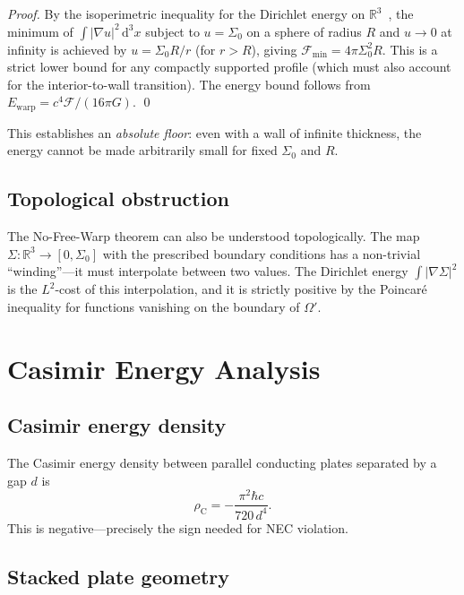 \documentclass[prd,twocolumn,superscriptaddress,longbibliography]{revtex4-2}
\newcommand{\Ewarp}{E_{\mathrm{warp}}}
\newcommand{\Fisher}{\mathcal{F}}
\newcommand{\dd}{\mathrm{d}}
\begin{document}
\noindent\emph{Proof.}\;
By the isoperimetric inequality for the Dirichlet energy on
$\mathbb{R}^3$~\cite{EvansBook}, the minimum of
$\int|\nabla u|^2\,\dd^3x$ subject to $u = \Sigma_0$ on a
sphere of radius $R$ and $u \to 0$ at infinity is achieved by
$u = \Sigma_0 R/r$ (for $r > R$), giving
$\Fisher_{\min} = 4\pi\Sigma_0^2 R$.  This is a strict lower
bound for any compactly supported profile (which must also account
for the interior-to-wall transition).  The energy bound
follows from $\Ewarp = c^4\Fisher/(16\pi G)$.  \qed

This establishes an \emph{absolute floor}: even with a
wall of infinite thickness, the energy cannot be made
arbitrarily small for fixed $\Sigma_0$ and $R$.

\subsection{Topological obstruction}

The No-Free-Warp theorem can also be understood topologically.
The map $\Sigma : \mathbb{R}^3 \to [0,\Sigma_0]$ with the
prescribed boundary conditions has a non-trivial ``winding''---it
must interpolate between two values.  The Dirichlet energy
$\int|\nabla\Sigma|^2$ is the $L^2$-cost of this interpolation,
and it is strictly positive by the Poincar\'{e} inequality for
functions vanishing on the boundary of $\Omega'$.

\section{Casimir Energy Analysis}
\label{sec:casimir}

\subsection{Casimir energy density}

The Casimir energy density between parallel conducting plates
separated by a gap $d$ is~\cite{Casimir1948}
\begin{equation}
\label{eq:rho_C}
\rho_{\mathrm{C}} = -\frac{\pi^2\hbar c}{720\,d^4}.
\end{equation}
This is negative---precisely the sign needed for NEC violation.

\subsection{Stacked plate geometry}
\end{document}
